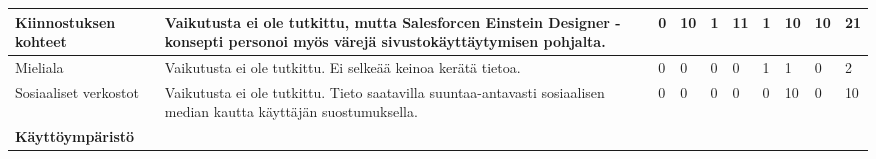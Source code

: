 \documentclass[finnish, 12pt, a4paper, elec, utf8, a-1b, online]{aaltothesis}
\begin{document}
{\begin{longtable}{p{2.5cm}|p{6cm}|p{0.5cm}p{0.5cm}p{0.5cm}|p{0.5cm}|p{0.5cm}p{0.5cm}p{0.5cm}|p{0.5cm}|}
        \midrule
        Kiinnostuksen kohteet                  & Vaikutusta ei ole tutkittu, mutta Salesforcen Einstein Designer -konsepti personoi myös värejä sivustokäyttäytymisen pohjalta.                                                                                                                                                                                           & 0                                          & 10                                  & 1                                      & 11                           & 1                                               & 10                                        & 10                                        & 21                           \\
        \midrule
        Mieliala                               & Vaikutusta ei ole tutkittu. Ei selkeää keinoa kerätä tietoa.                                                                                                                                                                                                                                                             & 0                                          & 0                                   & 0                                      & 0                            & 1                                               & 1                                         & 0                                         & 2                            \\
        \midrule
        Sosiaaliset verkostot                  & Vaikutusta ei ole tutkittu. Tieto saatavilla suuntaa-antavasti sosiaalisen median kautta käyttäjän suostumuksella.                                                                                                                                                                                                       & 0                                          & 0                                   & 0                                      & 0                            & 0                                               & 10                                        & 0                                         & 10                           \\
        \midrule
        \textbf{Käyttöympäristö}                                                                                                                                                                                                                                                                                                                                                                                                                                                                                                                                                                                                                                                                              \\

\end{longtable}}
\end{document}
